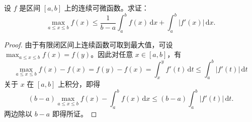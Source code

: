 \documentclass[../../main.tex]{subfiles}%
\begin{document}
\begin{example}
设 \( f \) 是区间 \([a,b]\) 上的连续可微函数。求证：
\[
\max_{a\leqslant x\leqslant b} f(x)\leqslant \frac{1}{b-a}\int_a^b{f(x)\,\mathrm{d}x}+\int_a^b{|f' (x)|\,\mathrm{d}x}.
\]
\end{example}
\begin{proof}
由于有限闭区间上连续函数可取到最大值，可设 \( \max_{a \leqslant x \leqslant b} f(x) = f(y) \)。因此对任意 \( x \in [a,b] \)，有
\[
\max_{a \leqslant x \leqslant b} f(x) - f(x) = f(y) - f(x) = \int_{x}^{y} f'(t) \, \mathrm{d}t \leqslant \int_{a}^{b} |f'(t)| \, \mathrm{d}t
\]
关于 \( x \) 在 \([a,b]\) 上积分，即得
\[
(b - a) \max_{a \leqslant x \leqslant b} f(x) - \int_{a}^{b} f(x) \, \mathrm{d}x \leqslant (b-a)\int_{a}^{b} |f'(t)| \, \mathrm{d}t.
\]
两边除以 \( b - a \) 即得所证。
\end{proof}
\end{document}
